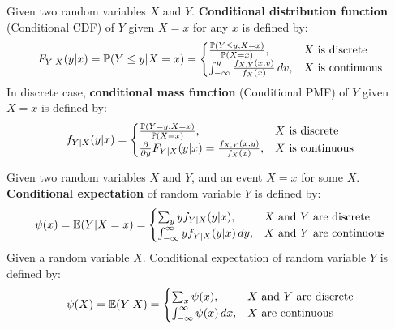 \documentclass{huhtakm-template-book}
\newcommand{\prob}{\mathbb{P}}
\newcommand{\expect}{\mathbb{E}}
\begin{document}
    \begin{sdefn}
        Given two random variables $X$ and $Y$. \textbf{Conditional distribution function} (Conditional CDF) of $Y$ given $X=x$ for any $x$ is defined by:
        \begin{equation*}
            F_{Y|X}(y|x)=\prob(Y\leq y|X=x)=\begin{cases}
                \frac{\prob(Y\leq y,X=x)}{\prob(X=x)}, &X\text{ is discrete}\\
                \intlu{-\infty}{y}\frac{f_{X,Y}(x,v)}{f_{X}(x)}\,dv, &X\text{ is continuous}
            \end{cases}
        \end{equation*}
        In discrete case, \textbf{conditional mass function} (Conditional PMF) of $Y$ given $X=x$ is defined by:
        \begin{equation*}
            f_{Y|X}(y|x)=\begin{cases}
                \frac{\prob(Y=y,X=x)}{\prob(X=x)}, &X\text{ is discrete}\\
                \pdv*{F_{Y|X}(y|x)}{y}=\frac{f_{X,Y}(x,y)}{f_{X}(x)}, &X\text{ is continuous}
            \end{cases}
        \end{equation*}
    \end{sdefn}
    \begin{sdefn}
        Given two random variables $X$ and $Y$, and an event $X=x$ for some $X$. \textbf{Conditional expectation} of random variable $Y$ is defined by:
        \begin{equation*}
            \psi(x)=\expect(Y|X=x)=\begin{cases}
                \sum_{y}yf_{Y|X}(y|x), &X\text{ and }Y\text{ are discrete}\\
                \intinfty yf_{Y|X}(y|x)\,dy, &X\text{ and }Y\text{ are continuous}
            \end{cases}
        \end{equation*}
        Given a random variable $X$. Conditional expectation of random variable $Y$ is defined by:
        \begin{equation*}
            \psi(X)=\expect(Y|X)=\begin{cases}
                \sum_{x}\psi(x), &X\text{ and }Y\text{ are discrete}\\
                \intinfty\psi(x)\,dx, &X\text{ are continuous}
            \end{cases}
        \end{equation*}
    \end{sdefn}
\end{document}
